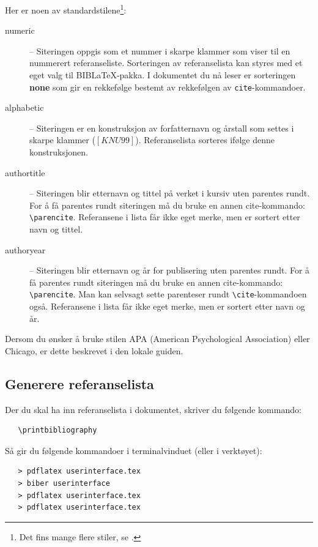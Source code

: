 \documentclass[11pt,norsk,a4paper]{article}
\newcommand{\kdo}[1]{\texttt{#1}}
\newcommand{\blt}{B{\smaller[2]IB}\discretionary{-}{}{\kern
    -0.12em}\LaTeX{}}
\begin{document}
Her er noen av standardstilene\footnote{Det fins mange flere stiler,
  se \cite[][63--68]{biblatex}.}:

\begin{description}
\item[numeric] -- Siteringen oppgis som et nummer i skarpe
klammer som viser til en nummerert referanseliste. Sorteringen av
referanselista kan styres med et eget valg til \blt-pakka. I 
dokumentet du nå leser er sorteringen \textbf{none} som gir en rekkefølge
bestemt av rekkefølgen av \kdo{cite}-kommandoer.

\item[alphabetic] -- Siteringen er en konstruksjon av
forfatternavn og årstall som settes i
skarpe klammer ($[KNU99]$). Referanselista sorteres ifølge denne konstruksjonen.

\item[authortitle] --  Siteringen blir etternavn og tittel på
verket i kursiv uten parentes rundt. For å få parentes rundt
siteringen må du bruke en annen cite-kommando:
\verb=\parencite=. Referansene i lista får ikke eget merke, men er
sortert etter navn og tittel.

\item[authoryear] -- Siteringen blir etternavn og år for publisering
  uten parentes rundt. For å få parentes rundt siteringen må du bruke
  en annen cite-kommando: \verb=\parencite=. Man kan selvsagt sette
  parenteser rundt \verb=\cite=-kommandoen også. Referansene i lista
  får ikke eget merke, men er sortert etter navn og år.
\end{description} 

Dersom du ønsker å bruke stilen APA (American Psychological Association) eller Chicago, er dette beskrevet i den lokale guiden.\cite{langmyhr13}

\subsection{Generere referanselista}
Der du skal ha inn referanselista i dokumentet, skriver du følgende
kommando:

{\footnotesize\begin{verbatim}
   \printbibliography
\end{verbatim}}

\noindent Så gir du følgende kommandoer i terminalvinduet (eller i verktøyet):

{\footnotesize\begin{verbatim}
   > pdflatex userinterface.tex
   > biber userinterface
   > pdflatex userinterface.tex
   > pdflatex userinterface.tex
\end{verbatim}}
\end{document}

